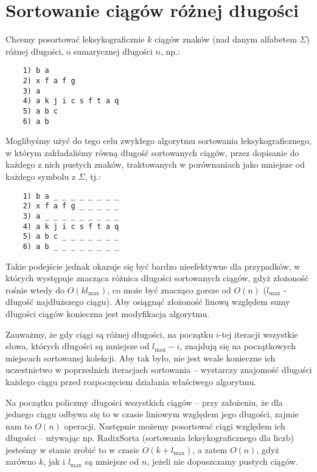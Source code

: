 \section{Sortowanie ciągów różnej długości}

\label{sec:sortowanieciagow}

Chcemy posortować leksykograficznie $k$ ciągów znaków (nad danym alfabetem $\Sigma$) różnej długości, o sumarycznej długości $n$, np.:

\begin{verbatim}
    1) b a
    2) x f a f g
    3) a
    4) a k j i c s f t a q
    5) a b c
    6) a b
\end{verbatim}

Moglibyśmy użyć do tego celu zwykłego algorytmu sortowania leksykograficznego, w którym zakładaliśmy równą długość sortowanych ciągów, przez dopisanie do każdego z nich pustych znaków, traktowanych w porównaniach jako mniejsze od każdego symbolu z $\Sigma$, tj.:

\begin{verbatim}
    1) b a _ _ _ _ _ _ _ _
    2) x f a f g _ _ _ _ _
    3) a _ _ _ _ _ _ _ _ _
    4) a k j i c s f t a q
    5) a b c _ _ _ _ _ _ _
    6) a b _ _ _ _ _ _ _ _
\end{verbatim}

Takie podejście jednak okazuje się być bardzo nieefektywne dla przypadków, w których występuje znacząca różnica długości sortowanych ciągów, gdyż złożoność rośnie wtedy do $O(kl_{\max})$, co może być znacząco gorsze od $O(n)$ ($l_{\max}$ - długość najdłuższego ciągu).
Aby osiągnąć złożoność linową względem sumy długości ciągów konieczna jest modyfikacja algorytmu.

Zauważmy, że gdy ciągi są różnej długości, na początku $i$-tej iteracji wszystkie słowa, których długości są mniejsze od $l_{\max} - i$, znajdują się na początkowych miejscach sortowanej kolekcji.
Aby tak było, nie jest wcale konieczne ich uczestnictwo w poprzednich iteracjach sortowania -- wystarczy znajomość długości każdego ciągu przed rozpoczęciem działania właściwego algorytmu.

Na początku policzmy długości wszystkich ciągów -- przy założeniu, że dla jednego ciągu odbywa się to w czasie liniowym względem jego długości, zajmie nam to $O(n)$ operacji.
Następnie możemy posortować ciągi względem ich długości -- używając np. RadixSorta (sortowania leksykograficznego dla liczb) jesteśmy w stanie zrobić to w czasie $O(k + l_{\max})$, a zatem $O(n)$, gdyż zarówno $k$, jak i $l_{\max}$ są mniejsze od $n$, jeżeli nie dopuszczamy pustych ciągów.

